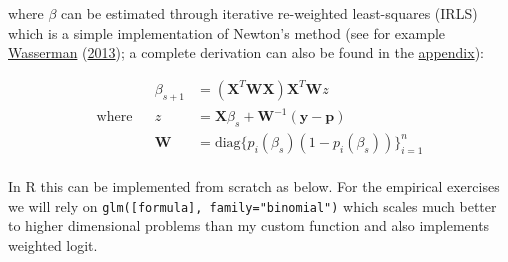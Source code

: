 \documentclass[
]{book}
\begin{document}
where \(\beta\) can be estimated through iterative re-weighted least-squares (IRLS) which is a simple implementation of Newton's method (see for example \protect\hyperlink{ref-wasserman2013all}{Wasserman} (\protect\hyperlink{ref-wasserman2013all}{2013}); a complete derivation can also be found in the \protect\hyperlink{irls}{appendix}):

\[
\begin{equation} 
\begin{aligned}
&& \beta_{s+1}&= \left( \mathbf{X}^T \mathbf{W} \mathbf{X} \right) \mathbf{X}^T \mathbf{W}z\\
\text{where}&& z&= \mathbf{X}\beta_{s} + \mathbf{W}^{-1} (\mathbf{y}-\mathbf{p}) \\
&& \mathbf{W}&= \text{diag}\{p_i(\beta_{s})(1-p_i(\beta_{s}))\}_{i=1}^n \\ 
\end{aligned}
\label{eq:irls}
\end{equation}
\]

In R this can be implemented from scratch as below. For the empirical exercises we will rely on \texttt{glm({[}formula{]},\ family="binomial")} which scales much better to higher dimensional problems than my custom function and also implements weighted logit.
\end{document}
